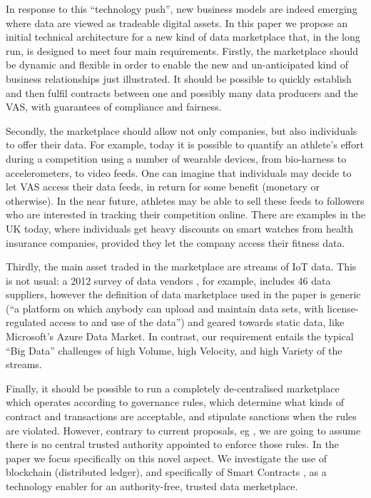 \documentclass[chi_draft]{sigchi}
\begin{document}
In response to this ``technology push'', new business models are indeed emerging \cite{Stahl2016,7765669} where data are viewed as tradeable digital assets. 
In this paper we propose an initial technical architecture for a new kind of data marketplace that, in the long run, is designed to meet four main requirements.
Firstly, the marketplace should be dynamic and flexible in order to enable the new and un-anticipated kind of business relationships just illustrated. It should be possible to quickly  establish and then fulfil contracts between one and possibly many data producers and the VAS, with guarantees of compliance and fairness.

Secondly, the marketplace should allow not only companies, but also individuals to offer their data. 
%
For example, today it is possible to quantify an athlete's effort during a competition using a number of wearable devices, from bio-harness to accelerometers, to video feeds.
One can imagine that individuals may decide to let VAS access their data feeds, in return for some benefit (monetary or otherwise).
In the near future, athletes may be able to sell these feeds to followers who are interested in tracking their competition online.
There are examples in the UK today, where individuals get heavy discounts on smart watches from health insurance companies, provided they let the company access their fitness data.

Thirdly, the main asset traded in the marketplace are streams of IoT data. This is not usual: a 2012 survey of data vendors \cite{Schomm2013}, for example, includes 46 data suppliers, however the definition of data marketplace used in the paper is generic (``a platform on which anybody can upload and maintain data sets, with license-regulated access to and use of the data'') and geared towards static data, like Microsoft's Azure Data Market.
In contrast, our requirement entails the typical ``Big Data'' challenges of high Volume, high Velocity, and high Variety of the streams.

Finally, it should be possible to run a completely de-centralised marketplace which operates according to governance rules, which determine what kinds of contract and transactions are acceptable, and stipulate sanctions when the rules are violated. 
However, contrary to current proposals, eg \cite{Cao:2016:MMR:2926746.2883611}, we are going to assume  there is no central trusted authority appointed to enforce those rules.
In the paper we focus specifically on this novel aspect. We investigate the use of blockchain (distributed ledger), and specifically of Smart Contracts \cite{Buterin2014}, as a technology enabler for an authority-free, trusted data merketplace.
\end{document}
